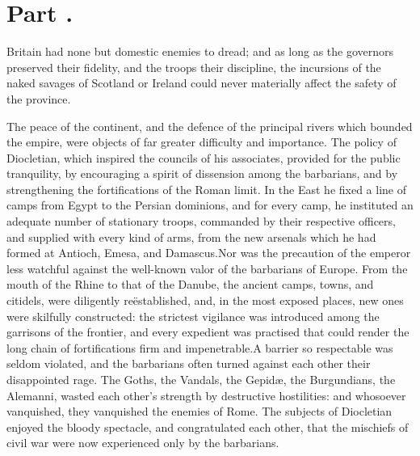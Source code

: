 \section{Part \thesection.}
\thispagestyle{simple}

Britain had none but domestic enemies to dread; and as long as
the governors preserved their fidelity, and the troops their
discipline, the incursions of the naked savages of Scotland or
Ireland could never materially affect the safety of the province.

The peace of the continent, and the defence of the principal
rivers which bounded the empire, were objects of far greater
difficulty and importance. The policy of Diocletian, which
inspired the councils of his associates, provided for the public
tranquility, by encouraging a spirit of dissension among the
barbarians, and by strengthening the fortifications of the Roman
limit. In the East he fixed a line of camps from Egypt to the
Persian dominions, and for every camp, he instituted an adequate
number of stationary troops, commanded by their respective
officers, and supplied with every kind of arms, from the new
arsenals which he had formed at Antioch, Emesa, and Damascus.\footnotemark[32]
Nor was the precaution of the emperor less watchful against the
well-known valor of the barbarians of Europe. From the mouth of
the Rhine to that of the Danube, the ancient camps, towns, and
citidels, were diligently reëstablished, and, in the most exposed
places, new ones were skilfully constructed: the strictest
vigilance was introduced among the garrisons of the frontier, and
every expedient was practised that could render the long chain of
fortifications firm and impenetrable.\footnotemark[33] A barrier so respectable
was seldom violated, and the barbarians often turned against each
other their disappointed rage. The Goths, the Vandals, the
Gepidæ, the Burgundians, the Alemanni, wasted each other’s
strength by destructive hostilities: and whosoever vanquished,
they vanquished the enemies of Rome. The subjects of Diocletian
enjoyed the bloody spectacle, and congratulated each other, that
the mischiefs of civil war were now experienced only by the
barbarians.\footnotemark[34]



